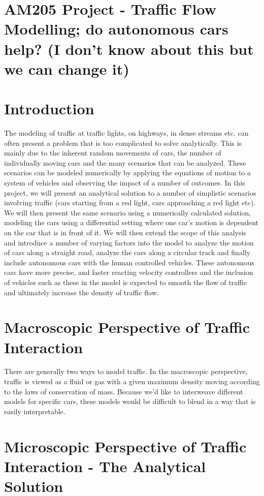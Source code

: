 \documentclass[11pt]{article}
\begin{document}
\lstset{language=Python, basicstyle=\scriptsize} %

\section*{AM205 Project - Traffic Flow Modelling; do autonomous cars help? (I don't know about this but we can change it)}

\section{Introduction}
The modeling of traffic at traffic lights, on highways, in dense streams etc. can often present a problem that is too complicated to solve analytically. This is mainly due to the inherent random movements of cars, the number of individually moving cars and the many scenarios that can be analyzed. These scenarios can be modeled numerically by applying the equations of motion to a system of vehicles and observing the impact of a number of outcomes. In this project, we will present an analytical solution to a number of simplistic scenarios involving traffic (cars starting from a red light, cars approaching a red light etc). We will then present the same scenario using a numerically calculated solution, modeling the cars using a differential setting where one car's motion is dependent on the car that is in front of it. We will then extend the scope of this analysis and introduce a number of varying factors into the model to analyze the motion of cars along a straight road, analyze the cars along a circular track and finally include autonomous cars with the human controlled vehicles. These autonomous cars have more precise, and faster reacting velocity controllers and the inclusion of vehicles such as these in the model is expected to smooth the flow of traffic and ultimately increase the density of traffic flow.

\section{Macroscopic Perspective of Traffic Interaction}
There are generally two ways to model traffic. In the macroscopic perspective, traffic is viewed as a fluid or gas with a given maximum density moving according to the laws of conservation of mass. Because we'd like to interweave different models for specific cars, these models would be difficult to blend in a way that is easily interpretable. 

\section{Microscopic Perspective of Traffic Interaction - The Analytical Solution}
\end{document}
